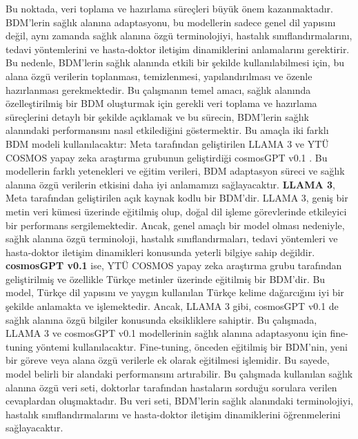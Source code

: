 \linebreak
Bu noktada, veri toplama ve hazırlama süreçleri büyük önem kazanmaktadır. BDM'lerin sağlık alanına adaptasyonu, bu modellerin sadece genel dil yapısını değil, aynı zamanda sağlık alanına özgü terminolojiyi, hastalık sınıflandırmalarını, tedavi yöntemlerini ve hasta-doktor iletişim dinamiklerini anlamalarını gerektirir. Bu nedenle, BDM'lerin sağlık alanında etkili bir şekilde kullanılabilmesi için, bu alana özgü verilerin toplanması, temizlenmesi, yapılandırılması ve özenle hazırlanması gerekmektedir.
\linebreak
Bu çalışmanın temel amacı, sağlık alanında özelleştirilmiş bir BDM oluşturmak için gerekli veri toplama ve hazırlama süreçlerini detaylı bir şekilde açıklamak ve bu sürecin, BDM'lerin sağlık alanındaki performansını nasıl etkilediğini göstermektir. Bu amaçla iki farklı BDM modeli kullanılacaktır: Meta tarafından geliştirilen LLAMA 3 \cite{llama3} ve YTÜ COSMOS yapay zeka araştırma grubunun geliştirdiği cosmosGPT v0.1 \cite{kesgin2024introducing}. Bu modellerin farklı yetenekleri ve eğitim verileri, BDM adaptasyon süreci ve sağlık alanına özgü verilerin etkisini daha iyi anlamamızı sağlayacaktır.
\linebreak
\textbf{LLAMA 3}, Meta tarafından geliştirilen açık kaynak kodlu bir BDM'dir. LLAMA 3, geniş bir metin veri kümesi üzerinde eğitilmiş olup, doğal dil işleme görevlerinde etkileyici bir performans sergilemektedir. Ancak, genel amaçlı bir model olması nedeniyle, sağlık alanına özgü terminoloji, hastalık sınıflandırmaları, tedavi yöntemleri ve hasta-doktor iletişim dinamikleri konusunda yeterli bilgiye sahip değildir.
\linebreak
\textbf{cosmosGPT v0.1} ise, YTÜ COSMOS yapay zeka araştırma grubu tarafından geliştirilmiş ve özellikle Türkçe metinler üzerinde eğitilmiş bir BDM'dir. Bu model, Türkçe dil yapısını ve yaygın kullanılan Türkçe kelime dağarcığını iyi bir şekilde anlamakta ve işlemektedir. Ancak, LLAMA 3 gibi, cosmosGPT v0.1 de sağlık alanına özgü bilgiler konusunda eksikliklere sahiptir.
\linebreak
Bu çalışmada, LLAMA 3 ve cosmosGPT v0.1 modellerinin sağlık alanına adaptasyonu için fine-tuning yöntemi kullanılacaktır. Fine-tuning, önceden eğitilmiş bir BDM'nin, yeni bir göreve veya alana özgü verilerle ek olarak eğitilmesi işlemidir. Bu sayede, model belirli bir alandaki performansını artırabilir. Bu çalışmada kullanılan sağlık alanına özgü veri seti, doktorlar tarafından hastaların sorduğu sorulara verilen cevaplardan oluşmaktadır. Bu veri seti, BDM'lerin sağlık alanındaki terminolojiyi, hastalık sınıflandırmalarını ve hasta-doktor iletişim dinamiklerini öğrenmelerini sağlayacaktır.
